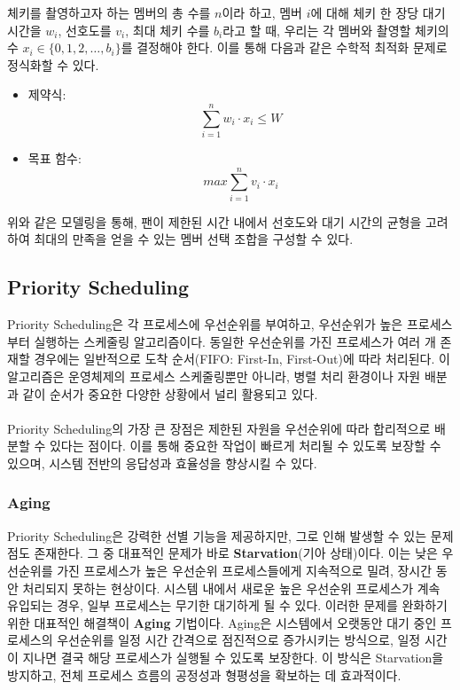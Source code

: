 \documentclass[12pt,hidelinks]{article}
\begin{document}
\noindent 체키를 촬영하고자 하는 멤버의 총 수를 $n$이라 하고, 멤버 $i$에 대해 체키 한 장당 대기 시간을 $w_i$, 선호도를 $v_i$, 최대 체키 수를 $b_i$라고 할 때, 우리는 각 멤버와 촬영할 체키의 수 $x_i \in \lbrace 0,1,2,\dots,b_i \rbrace$를 결정해야 한다. 이를 통해 다음과 같은 수학적 최적화 문제로 정식화할 수 있다.

\begin{itemize}
\item 제약식: \[\displaystyle \sum ^n _{i=1} w_i \cdot x_i \leq W \]
\item 목표 함수: \[\displaystyle max \sum ^n _{i=1} v_i \cdot x_i \]
\end{itemize}

\noindent 위와 같은 모델링을 통해, 팬이 제한된 시간 내에서 선호도와 대기 시간의 균형을 고려하여 최대의 만족을 얻을 수 있는 멤버 선택 조합을 구성할 수 있다.

\subsection{Priority Scheduling}
Priority Scheduling은 각 프로세스에 우선순위를 부여하고, 우선순위가 높은 프로세스부터 실행하는 스케줄링 알고리즘이다. 동일한 우선순위를 가진 프로세스가 여러 개 존재할 경우에는 일반적으로 도착 순서(FIFO: First-In, First-Out)에 따라 처리된다. 이 알고리즘은 운영체제의 프로세스 스케줄링뿐만 아니라, 병렬 처리 환경이나 자원 배분과 같이 순서가 중요한 다양한 상황에서 널리 활용되고 있다.
\\
\\
Priority Scheduling의 가장 큰 장점은 제한된 자원을 우선순위에 따라 합리적으로 배분할 수 있다는 점이다. 이를 통해 중요한 작업이 빠르게 처리될 수 있도록 보장할 수 있으며, 시스템 전반의 응답성과 효율성을 향상시킬 수 있다.

\subsubsection{Aging}
Priority Scheduling은 강력한 선별 기능을 제공하지만, 그로 인해 발생할 수 있는 문제점도 존재한다. 그 중 대표적인 문제가 바로 \textbf{Starvation}(기아 상태)이다. 이는 낮은 우선순위를 가진 프로세스가 높은 우선순위 프로세스들에게 지속적으로 밀려, 장시간 동안 처리되지 못하는 현상이다. 시스템 내에서 새로운 높은 우선순위 프로세스가 계속 유입되는 경우, 일부 프로세스는 무기한 대기하게 될 수 있다. 이러한 문제를 완화하기 위한 대표적인 해결책이 \textbf{Aging} 기법이다. Aging은 시스템에서 오랫동안 대기 중인 프로세스의 우선순위를 일정 시간 간격으로 점진적으로 증가시키는 방식으로, 일정 시간이 지나면 결국 해당 프로세스가 실행될 수 있도록 보장한다. 이 방식은 Starvation을 방지하고, 전체 프로세스 흐름의 공정성과 형평성을 확보하는 데 효과적이다.
\end{document}
